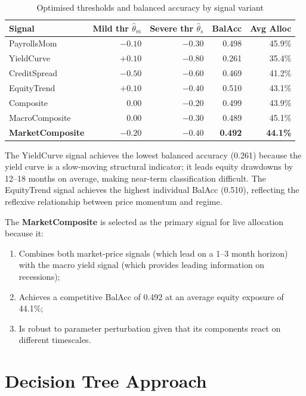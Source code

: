 \documentclass[11pt, a4paper]{article}
\begin{document}
\begin{table}[H]
\centering
\caption{Optimised thresholds and balanced accuracy by signal variant}
\label{tab:thresholds}
\begin{tabular}{lrrrr}
\toprule
\textbf{Signal}       & \textbf{Mild thr} $\hat{\theta}_m$ & \textbf{Severe thr} $\hat{\theta}_s$ & \textbf{BalAcc} & \textbf{Avg Alloc} \\
\midrule
PayrollsMom      & $-0.10$ & $-0.30$ & 0.498 & 45.9\% \\
YieldCurve       & $+0.10$ & $-0.80$ & 0.261 & 35.4\% \\
CreditSpread     & $-0.50$ & $-0.60$ & 0.469 & 41.2\% \\
EquityTrend      & $+0.10$ & $-0.40$ & 0.510 & 43.1\% \\
Composite        & $0.00$  & $-0.20$ & 0.499 & 43.9\% \\
MacroComposite   & $0.00$  & $-0.30$ & 0.489 & 45.1\% \\
\textbf{MarketComposite} & $\mathbf{-0.20}$ & $\mathbf{-0.40}$ & \textbf{0.492} & \textbf{44.1\%} \\
\bottomrule
\end{tabular}
\end{table}

The YieldCurve signal achieves the lowest balanced accuracy (0.261) because
the yield curve is a slow-moving structural indicator; it leads equity
drawdowns by 12--18 months on average, making near-term classification
difficult. The EquityTrend signal achieves the highest individual BalAcc
(0.510), reflecting the reflexive relationship between price momentum and
regime.

The \textbf{MarketComposite} is selected as the primary signal for live
allocation because it:
\begin{enumerate}[leftmargin=2em]
  \item Combines both market-price signals (which lead on a 1--3 month horizon)
        with the macro yield signal (which provides leading information on
        recessions);
  \item Achieves a competitive BalAcc of 0.492 at an average equity exposure
        of 44.1\%;
  \item Is robust to parameter perturbation given that its components react
        on different timescales.
\end{enumerate}

\section{Decision Tree Approach}
\label{sec:tree}
\end{document}
